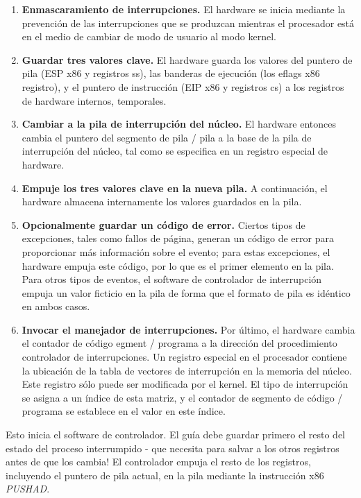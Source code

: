 \documentclass[10pt]{book}
\begin{document}
\begin{enumerate}
\item \textbf{Enmascaramiento de interrupciones.} El hardware se inicia mediante la prevención de las interrupciones que se produzcan mientras el procesador está en el medio de cambiar de modo de usuario al modo kernel.

\item \textbf{Guardar tres valores clave.} El hardware guarda los valores del puntero de pila (ESP x86 y registros ss), las banderas de ejecución (los eflags x86 registro), y el puntero de instrucción (EIP x86 y registros cs) a los registros de hardware internos, temporales.

\item \textbf{Cambiar a la pila de interrupción del núcleo.} El hardware entonces cambia el puntero del segmento de pila / pila a la base de la pila de interrupción del núcleo, tal como se especifica en un registro especial de hardware.

\item \textbf{Empuje los tres valores clave en la nueva pila.} A continuación, el hardware almacena internamente los valores guardados en la pila.

\item \textbf{Opcionalmente guardar un código de error.} Ciertos tipos de excepciones, tales como fallos de página, generan un código de error para proporcionar más información sobre el evento; para estas excepciones, el hardware empuja este código, por lo que es el primer elemento en la pila. Para otros tipos de eventos, el software de controlador de interrupción empuja un valor ficticio en la pila de forma que el formato de pila es idéntico en ambos casos.

\item \textbf{Invocar el manejador de interrupciones.} Por último, el hardware cambia el contador de código egment / programa a la dirección del procedimiento controlador de interrupciones. Un registro especial en el procesador contiene la ubicación de la tabla de vectores de interrupción en la memoria del núcleo. Este registro sólo puede ser modificada por el kernel. El tipo de interrupción se asigna a un índice de esta matriz, y el contador de segmento de código / programa se establece en el valor en este índice.
\end{enumerate}

Esto inicia el software de controlador.
El guía debe guardar primero el resto del estado del proceso interrumpido - que necesita para salvar a los otros registros antes de que los cambia! El controlador empuja el resto de los registros, incluyendo el puntero de pila actual, en la pila mediante la instrucción x$86$ \textit{PUSHAD}.
\end{document}

